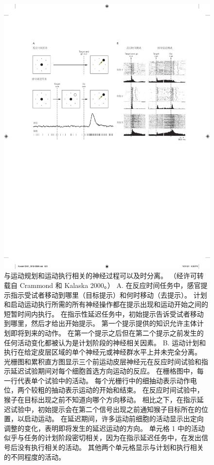 \begin{figure}[!htb]
	\centering
	\includegraphics[width=1.0\linewidth]{chap34/fig_34_4}
	\caption*{与运动规划和运动执行相关的神经过程可以及时分离。 （经许可转载自 Crammond 和 Kalaska 2000。）
	A. 在反应时间任务中，感官提示指示受试者移动到哪里（目标提示）和何时移动（去提示）。 计划和启动运动执行所需的所有神经操作都在提示出现和运动开始之间的短暂时间内执行。 在指示性延迟任务中，初始提示告诉受试者移动到哪里，然后才给出开始提示。 第一个提示提供的知识允许主体计划即将到来的动作。 在第一个提示之后但在第二个提示之前发生的任何活动变化都被认为是计划阶段的神经相关因素。
	B. 运动计划和执行在给定皮层区域的单个神经元或神经群水平上并未完全分离。 光栅图和累积直方图显示三个前运动皮层神经元在反应时间试验和指示延迟试验期间对每个细胞首选方向运动的反应。 在栅格图中，每一行代表单个试验中的活动。 每个光栅行中的细抽动表示动作电位，两个较粗的抽动表示运动的开始和结束。 在反应时间试验中，猴子在目标出现之前不知道向哪个方向移动。 相比之下，在指示延迟试验中，初始提示会在第二个信号出现之前通知猴子目标所在的位置，以启动运动。 在延迟期间，许多运动前细胞的活动显示出定向调整的变化，表明即将发生的延迟运动的方向。 单元格 1 中的活动似乎与任务的计划阶段密切相关，因为在指示延迟任务中，在发出信号后没有执行相关的活动。 其他两个单元格显示与计划和执行相关的不同程度的活动。}
\end{figure}


